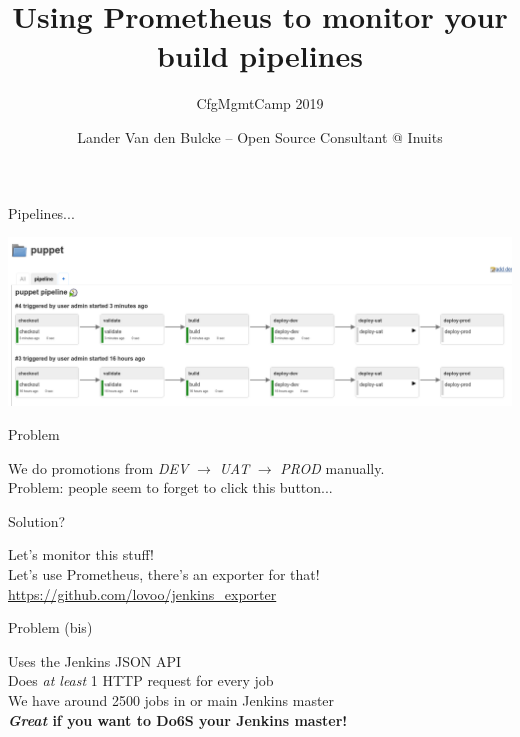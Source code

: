 \documentclass[aspectratio=169,12pt]{beamer}
\title{Using Prometheus to monitor your build pipelines}
\subtitle{CfgMgmtCamp 2019}
\author{Lander Van den Bulcke -- Open Source Consultant @ Inuits}
\date{}
\institute{landervdb @ \{twitter,github,freenode\}}
\begin{document}
\maketitle

\begin{frame}{Pipelines...}
  \begin{center}
    \includegraphics[width=\textwidth]{img/pipeline.png}
  \end{center}
\end{frame}

\begin{frame}[fragile]{Problem}
  \begin{center}
    We do promotions from \textit{DEV} $\rightarrow$ \textit{UAT} $\rightarrow$ \textit{PROD} manually. \\
    \vspace{20pt}
    Problem: people seem to forget to click this button...
  \end{center}
\end{frame}

\begin{frame}[fragile]{Solution?}
  \begin{center}
    Let's monitor this stuff! \\
    \vspace{20pt}
    Let's use Prometheus, there's an exporter for that! \\
    \vspace{20pt}
    \url{https://github.com/lovoo/jenkins_exporter}
  \end{center}
\end{frame}

\begin{frame}[fragile]{Problem (bis)}
  \begin{center}
    Uses the Jenkins JSON API \\
    \vspace{20pt}
    Does \textit{at least} 1 HTTP request for every job \\
    \vspace{20pt}
    We have around 2500 jobs in or main Jenkins master \\
    \vspace{20pt}
    \textbf{\textit{Great} if you want to Do6S your Jenkins master!}
  \end{center}
\end{frame}
\end{document}
